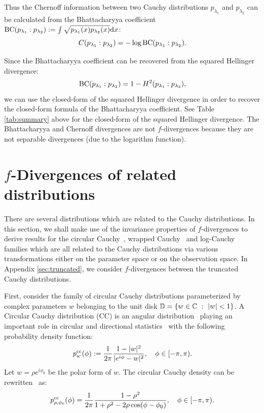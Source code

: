 \documentclass[journal]{IEEEtran}
\begin{document}
Thus the Chernoff information between two Cauchy distributions $p_{\lambda_1}$ and $p_{\lambda_2}$ can be calculated from the Bhattacharyya coefficient $\mathrm{BC}(p_{\lambda_1}:p_{\lambda_2}):=\int \sqrt{p_{\lambda_1}(x)p_{\lambda_2}(x)}\mathrm{d}x$:
$$
C(p_{\lambda_1} : p_{\lambda_2})=-\log \mathrm{BC}(p_{\lambda_1}:p_{\lambda_2}).
$$


Since the Bhattacharyya coefficient can be recovered from the squared Hellinger divergence:
$$
\mathrm{BC}(p_{\lambda_1}:p_{\lambda_2}) = 1-H^2 (p_{\lambda_1}:p_{\lambda_2}),
$$ 
we can use the closed-form of the squared Hellinger divergence in order to recover the closed-form formula of the  Bhattacharyya coefficient. 
See Table \ref{tab:summary} above for the closed-form of the squared Hellinger divergence. 
The Bhattacharyya and Chernoff divergences are not $f$-divergences because they are not separable divergences (due to the logarithm function).


\section{$f$-Divergences of related distributions}\label{sec:logcauchy}

There are several distributions which are related to the Cauchy distributions. 
In this section, we shall make use of the invariance properties of $f$-divergences to derive results for the circular Cauchy~\cite{kato2013extended,pewsey2013circular}, wrapped Cauchy~\cite{MLE-WrappedCauchy-1988} and log-Cauchy~\cite{olkin2007life} families which are all related to the Cauchy distributions via various transformations either on the parameter space or on the observation space.
In Appendix \ref{sec:truncated}, 
we consider $f$-divergences between the truncated Cauchy distributions.  

First, consider the family of circular Cauchy distributions parameterized by complex parameters $w$ belonging to the unit disk $\bbD=\{w\in\bbC\ :\ |w|<1\}$. 
A Circular Cauchy distribution (CC) is an angular distribution~\cite{pewsey2013circular} playing an important role in circular and directional statistics~\cite{mardia2009directional} with the following probability density function:
$$
p_w^{\mathrm{cc}}(\phi):=\frac{1}{2\pi} \frac{1-|w|^2}{|e^{i\phi}-w|^2},  \quad \phi\in [-\pi,\pi). 
$$
Let $w=\rho e^{i\phi_0}$ be the polar form of $w$. 
The circular Cauchy density can be rewritten~\cite{kato2013extended} as:
$$
p_{\rho,\phi_0}^{\mathrm{cc}}(\phi)=\frac{1}{2\pi} \frac{1-\rho^2}{1+\rho^2-2\rho\cos(\phi-\phi_0)},\quad \phi\in [-\pi,\pi).
$$
\end{document}
